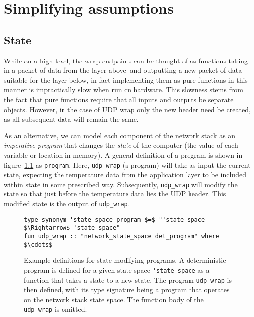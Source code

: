 \documentclass[twoside]{memoir}
\begin{document}

\chapter{Simplifying assumptions}
\section{State}
While on a high level, the wrap endpoints can be thought of as
functions taking in a packet of data from the layer above, and outputting a 
new packet of data suitable for the layer below,
in fact implementing them as pure functions in this manner
is impractically slow when run on hardware.
This slowness stems from the fact that pure functions require that all inputs and outputs be
separate objects.
However, in the case of UDP wrap only the new header need be created,
as all subsequent data will remain the same.

As an alternative, we can model each component of the network stack
as an \textit{imperative program} that changes the \textit{state} of the computer
(the value of each variable or location in memory). 
A general definition of a program is shown in figure~\ref{fig:prog-def-det-nondet} as \lstinline{program}.
Here, \lstinline{udp_wrap} (a program) will take as input the current state,
expecting the temperature data from the application layer to be included within state in some prescribed way.
Subsequently, \lstinline{udp_wrap} will modify the state so that just before the
temperature data lies the UDP header.
This modified state is the output of \lstinline{udp_wrap}.

\begin{figure}[htb]
    \centering
\begin{lstlisting}[language=isabelle]
type_synonym 'state_space program $=$ "'state_space $\Rightarrow$ 'state_space"
fun udp_wrap :: "network_state_space det_program" where $\cdots$
\end{lstlisting}
    \caption{Example definitions for state-modifying programs.
    A deterministic program is defined for a
    given state space \lstinline{'state_space}
    as a function that takes a state to a new state.
    The program \lstinline{udp_wrap} is then defined, with its type signature
    being a program that operates on the network stack state space.
    The function body of the \lstinline{udp_wrap} is omitted.
    }
    \label{fig:prog-def-det-nondet}
\end{figure}
\end{document}
